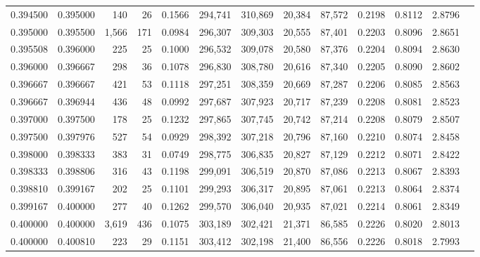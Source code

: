\begin{tabular}{rrrrrrrrrrrrr}
0.394500 & 0.395000 &   140 &  26 &                                     0.1566 & 294,741 & 310,869 &  20,384 &  87,572 & 0.2198 & 0.8112 & 2.8796 \\
0.395000 & 0.395500 & 1,566 & 171 &                                     0.0984 & 296,307 & 309,303 &  20,555 &  87,401 & 0.2203 & 0.8096 & 2.8651 \\
0.395508 & 0.396000 &   225 &  25 &                                     0.1000 & 296,532 & 309,078 &  20,580 &  87,376 & 0.2204 & 0.8094 & 2.8630 \\
0.396000 & 0.396667 &   298 &  36 &                                     0.1078 & 296,830 & 308,780 &  20,616 &  87,340 & 0.2205 & 0.8090 & 2.8602 \\
0.396667 & 0.396667 &   421 &  53 &                                     0.1118 & 297,251 & 308,359 &  20,669 &  87,287 & 0.2206 & 0.8085 & 2.8563 \\
0.396667 & 0.396944 &   436 &  48 &                                     0.0992 & 297,687 & 307,923 &  20,717 &  87,239 & 0.2208 & 0.8081 & 2.8523 \\
0.397000 & 0.397500 &   178 &  25 &                                     0.1232 & 297,865 & 307,745 &  20,742 &  87,214 & 0.2208 & 0.8079 & 2.8507 \\
0.397500 & 0.397976 &   527 &  54 &                                     0.0929 & 298,392 & 307,218 &  20,796 &  87,160 & 0.2210 & 0.8074 & 2.8458 \\
0.398000 & 0.398333 &   383 &  31 &                                     0.0749 & 298,775 & 306,835 &  20,827 &  87,129 & 0.2212 & 0.8071 & 2.8422 \\
0.398333 & 0.398806 &   316 &  43 &                                     0.1198 & 299,091 & 306,519 &  20,870 &  87,086 & 0.2213 & 0.8067 & 2.8393 \\
0.398810 & 0.399167 &   202 &  25 &                                     0.1101 & 299,293 & 306,317 &  20,895 &  87,061 & 0.2213 & 0.8064 & 2.8374 \\
0.399167 & 0.400000 &   277 &  40 &                                     0.1262 & 299,570 & 306,040 &  20,935 &  87,021 & 0.2214 & 0.8061 & 2.8349 \\
0.400000 & 0.400000 & 3,619 & 436 &                                     0.1075 & 303,189 & 302,421 &  21,371 &  86,585 & 0.2226 & 0.8020 & 2.8013 \\
0.400000 & 0.400810 &   223 &  29 &                                     0.1151 & 303,412 & 302,198 &  21,400 &  86,556 & 0.2226 & 0.8018 & 2.7993 \\

\end{tabular}
